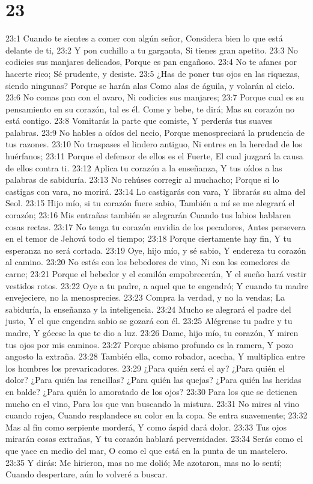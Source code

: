 \chapter{23}


23:1 Cuando te sientes a comer con algún señor,  
Considera bien lo que está delante de ti,  
23:2 Y pon cuchillo a tu garganta,  
Si tienes gran apetito.  
23:3 No codicies sus manjares delicados,  
Porque es pan engañoso.  
23:4 No te afanes por hacerte rico;  
Sé prudente, y desiste.  
23:5 ¿Has de poner tus ojos en las riquezas, siendo ningunas?  
Porque se harán alas  
Como alas de águila, y volarán al cielo.  
23:6 No comas pan con el avaro,  
Ni codicies sus manjares;  
23:7 Porque cual es su pensamiento en su corazón, tal es él.  
Come y bebe, te dirá;  
Mas su corazón no está contigo.  
23:8 Vomitarás la parte que comiste,  
Y perderás tus suaves palabras.  
23:9 No hables a oídos del necio,  
Porque menospreciará la prudencia de tus razones.  
23:10 No traspases el lindero antiguo,  
Ni entres en la heredad de los huérfanos;  
23:11 Porque el defensor de ellos es el Fuerte,  
El cual juzgará la causa de ellos contra ti.  
23:12 Aplica tu corazón a la enseñanza,  
Y tus oídos a las palabras de sabiduría.  
23:13 No rehúses corregir al muchacho;  
Porque si lo castigas con vara, no morirá.  
23:14 Lo castigarás con vara,  
Y librarás su alma del Seol.  
23:15 Hijo mío, si tu corazón fuere sabio,  
También a mí se me alegrará el corazón;  
23:16 Mis entrañas también se alegrarán 
Cuando tus labios hablaren cosas rectas.  
23:17 No tenga tu corazón envidia de los pecadores,  
Antes persevera en el temor de Jehová todo el tiempo;  
23:18 Porque ciertamente hay fin,  
Y tu esperanza no será cortada.  
23:19 Oye, hijo mío, y sé sabio,  
Y endereza tu corazón al camino.  
23:20 No estés con los bebedores de vino,  
Ni con los comedores de carne;  
23:21 Porque el bebedor y el comilón empobrecerán,  
Y el sueño hará vestir vestidos rotos.  
23:22 Oye a tu padre, a aquel que te engendró;  
Y cuando tu madre envejeciere, no la menosprecies.  
23:23 Compra la verdad, y no la vendas;  
La sabiduría, la enseñanza y la inteligencia.  
23:24 Mucho se alegrará el padre del justo,  
Y el que engendra sabio se gozará con él.  
23:25 Alégrense tu padre y tu madre,  
Y gócese la que te dio a luz.  
23:26 Dame, hijo mío, tu corazón,  
Y miren tus ojos por mis caminos.  
23:27 Porque abismo profundo es la ramera,  
Y pozo angosto la extraña.  
23:28 También ella, como robador, acecha,  
Y multiplica entre los hombres los prevaricadores.  
23:29 ¿Para quién será el ay? ¿Para quién el dolor? ¿Para quién las rencillas?  
¿Para quién las quejas? ¿Para quién las heridas en balde?  
¿Para quién lo amoratado de los ojos?  
23:30 Para los que se detienen mucho en el vino,  
Para los que van buscando la mistura.  
23:31 No mires al vino cuando rojea,  
Cuando resplandece su color en la copa.  
Se entra suavemente;  
23:32 Mas al fin como serpiente morderá,  
Y como áspid dará dolor.  
23:33 Tus ojos mirarán cosas extrañas,  
Y tu corazón hablará perversidades.  
23:34 Serás como el que yace en medio del mar,  
O como el que está en la punta de un mastelero.  
23:35 Y dirás: Me hirieron, mas no me dolió;  
Me azotaron, mas no lo sentí;  
Cuando despertare, aún lo volveré a buscar.  

